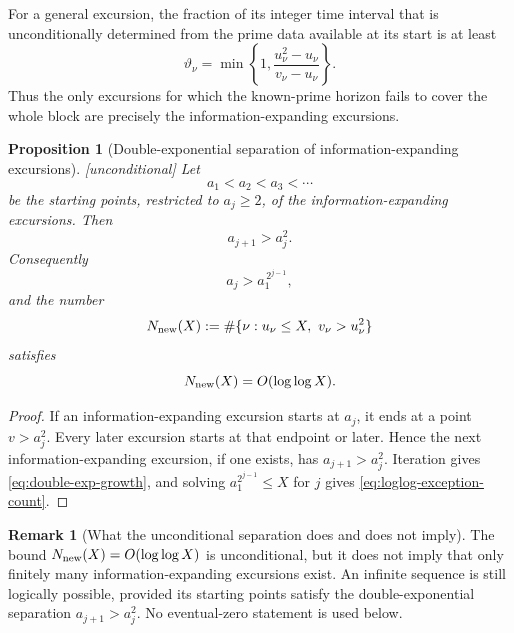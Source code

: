 \documentclass[11pt,reqno]{amsart}
\theoremstyle{plain}
\newtheorem{proposition}[theorem]{Proposition}
\theoremstyle{definition}
\newtheorem{remark}[theorem]{Remark}
\begin{document}
For a general excursion, the fraction of its integer time interval that is
unconditionally determined from the prime data available at its start is at
least
\begin{equation}
\label{eq:known-fraction}
  \vartheta_\nu
  =\min\!\left\{1,
  \frac{u_\nu^2-u_\nu}{v_\nu-u_\nu}\right\}.
\end{equation}
Thus the only excursions for which the known-prime horizon fails to cover the
whole block are precisely the information-expanding excursions.

\begin{proposition}[Double-exponential separation of information-expanding excursions]
\label{prop:double-exp-separation}
\emph{[unconditional]} Let
\[
  a_1<a_2<a_3<\cdots
\]
be the starting points, restricted to $a_j\ge2$, of the information-expanding
excursions.  Then
\begin{equation}
\label{eq:double-exp-separation}
  a_{j+1}>a_j^2.
\end{equation}
Consequently
\begin{equation}
\label{eq:double-exp-growth}
  a_j>a_1^{\,2^{j-1}},
\end{equation}
and the number
\[
  N_{\rm new}(X)
  :=\#\{\nu:u_\nu\le X,\ v_\nu>u_\nu^2\}
\]
satisfies
\begin{equation}
\label{eq:loglog-exception-count}
  N_{\rm new}(X)=O(\log\log X).
\end{equation}
\end{proposition}

\begin{proof}
If an information-expanding excursion starts at $a_j$, it ends at a point
$v>a_j^2$.  Every later excursion starts at that endpoint or later.  Hence the
next information-expanding excursion, if one exists, has
$a_{j+1}>a_j^2$.  Iteration gives \eqref{eq:double-exp-growth}, and solving
$a_1^{2^{j-1}}\le X$ for $j$ gives \eqref{eq:loglog-exception-count}.
\end{proof}

\begin{remark}[What the unconditional separation does and does not imply]
\label{rem:unconditional-information-separation}
The bound $N_{\rm new}(X)=O(\log\log X)$ is unconditional, but it does not imply
that only finitely many information-expanding excursions exist.  An infinite
sequence is still logically possible, provided its starting points satisfy the
double-exponential separation $a_{j+1}>a_j^2$.  No eventual-zero statement is
used below.
\end{remark}
\end{document}
